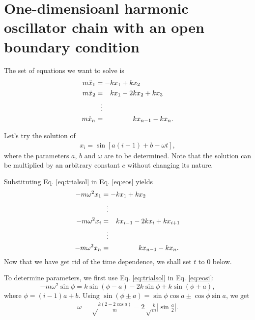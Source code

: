 \documentclass[12pt]{article}
\begin{document}
\section{One-dimensioanl harmonic oscillator chain with an open boundary condition }

The set of equations we want to solve is
\begin{equation}
\begin{split}
m \ddot x_1 &= -k x_1 + k x_2 \\
m \ddot x_2 &= \hphantom{-}  k x_1 - 2 k x_2   + k x_3 \\
            &\hphantom{-} \vdots \\
m \ddot x_n &= \hphantom{-k x_1 -2}        k x_{n-1}  - k x_n.
\end{split}
\label{eq:eos}
\end{equation}


Let's try the solution of
\begin{align}
  x_i = \sin[a (i - 1) + b - \omega t],
  \label{eq:trialsol}
\end{align}
where the parameters $a$, $b$ and $\omega$ are to be determined.
Note that the solution can be multiplied by an arbitrary constant $c$
without changing its nature.



Substituting Eq. \eqref{eq:trialsol} in Eq. \eqref{eq:eos} yields
\begin{align}
-m \omega^2 x_1 &= -k x_1 + k x_2 \label{eq:eos1} \\
                &\hphantom{-} \vdots \notag \\
-m \omega^2 x_i &= \hphantom{-}  k x_{i-1} - 2 k x_i + k x_{i+1}
  \label{eq:eosi} \\
                &\hphantom{-} \vdots \notag \\
-m \omega^2 x_n &= \hphantom{-k x_1 -2}        k x_{n-1}  - k x_n.
  \label{eq:eosn}
\end{align}
Now that we have get rid of the time dependence,
we shall set $t$ to 0 below.

To determine parameters,
we first use Eq. \eqref{eq:trialsol} in Eq. \eqref{eq:eosi}:
\[
-m \omega^2 \sin\phi
=
k \sin(\phi - a)
-2 k \sin\phi
+k \sin(\phi + a),
\]
where $\phi = (i-1)a + b$.
Using $\sin(\phi \pm a) = \sin\phi \cos a \pm \cos\phi \sin a$, we get
\begin{align}
\omega
=
\sqrt \frac { k (2 - 2 \cos a) } m
=
2 \sqrt \frac k m \left| \sin \frac a 2 \right|.
\label{eq:omega_a}
\end{align}
\end{document}
